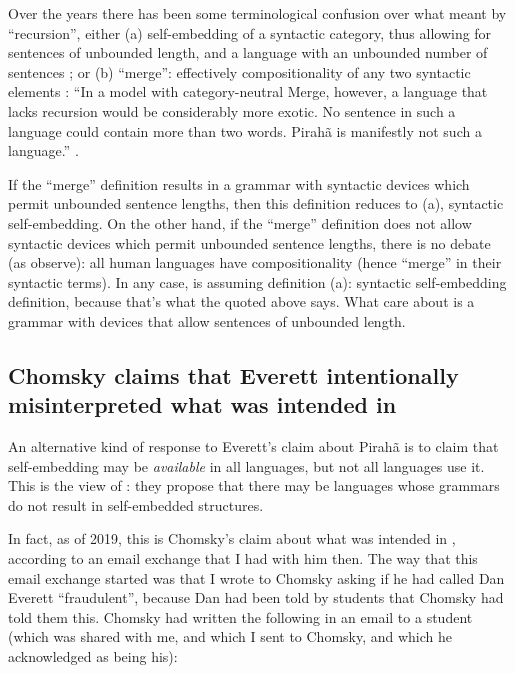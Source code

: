 \documentclass[output=paper]{langscibook}
\begin{document}
Over the years there has been some terminological confusion over what \citet{hauser2002faculty} meant by ``recursion'', either (a) self-embedding of a syntactic category, thus allowing for sentences of unbounded length, and a language with an unbounded number of sentences \citep{everett2005cultural}; or (b) ``merge'': effectively compositionality of any two syntactic elements \citep{nevins2009evidence}: ``In a model with category-neutral Merge, however, a language that lacks recursion would be considerably more exotic. No sentence in such a language could contain more than two words. Pirahã is manifestly not such a language.'' \citep[366]{nevins2009evidence}.

If the ``merge'' definition results in a grammar with syntactic devices which permit unbounded sentence lengths, then this definition reduces to (a), syntactic self-embedding. On the other hand, if the ``merge'' definition does not allow syntactic devices which permit unbounded sentence lengths, there is no debate (as \citet{nevins2009evidence} observe): all human languages have compositionality (hence ``merge'' in their syntactic terms). In any case, \citet{everett2005cultural} is assuming definition (a): syntactic self-embedding definition, because that’s what the \citet{hauser2002faculty} quoted above says. What \citet{hauser2002faculty} care about is a grammar with devices that allow sentences of unbounded length.

\subsection{Chomsky claims that Everett intentionally misinterpreted what was intended in \citet{hauser2002faculty}}

An alternative kind of response to Everett’s claim about Pirahã is to claim that self-embedding may be \textit{available} in all languages, but not all languages use it. This is the view of \citet{jackendoff2014what}: they propose that there may be languages whose grammars do not result in self-embedded structures.

In fact, as of 2019, this is Chomsky’s claim about what was intended in \citet{hauser2002faculty}, according to an email exchange that I had with him then. The way that this email exchange started was that I wrote to Chomsky asking if he had called Dan Everett ``fraudulent'', because Dan had been told by students that Chomsky had told them this. Chomsky had written the following in an email to a student (which was shared with me, and which I sent to Chomsky, and which he acknowledged as being his):
\end{document}
